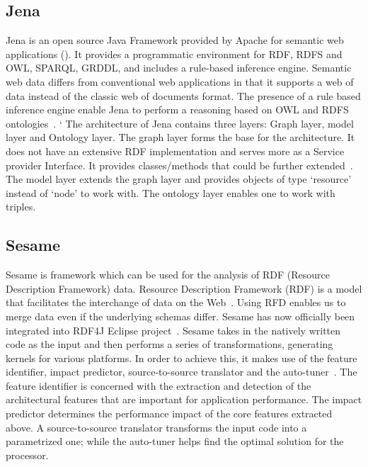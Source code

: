      \pv

\subsection{Jena }

Jena is an open source Java Framework provided by Apache for semantic
web applications (\cite{www-w3-jena}). It provides a programmatic
environment for RDF, RDFS and OWL, SPARQL, GRDDL, and includes a
rule-based inference engine. Semantic web data differs from
conventional web applications in that it supports a web of data
instead of the classic web of documents format. The presence of a rule
based inference engine enable Jena to perform a reasoning based on OWL
and RDFS ontologies~\cite{www-trimc-nlp-blogspot}. ` The architecture
of Jena contains three layers: Graph layer, model layer and Ontology
layer. The graph layer forms the base for the architecture. It does
not have an extensive RDF implementation and serves more as a Service
provider Interface. It provides classes/methods that could be further
extended~\cite{www-trimc-nlp-blogspot}.  The model layer extends the
graph layer and provides objects of type ‘resource’ instead of ‘node’
to work with.  The ontology layer enables one to work with triples.

     \pv

\subsection{Sesame}

Sesame is framework which can be used for the analysis of RDF
(Resource Description Framework) data.  Resource Description Framework
(RDF) is a model that facilitates the interchange of data on the
Web~\cite{www-RDF}.  Using RFD enables us to merge data even if the
underlying schemas differ.  Sesame has now officially been integrated
into RDF4J Eclipse project~\cite{www-sesame}.  Sesame takes in the
natively written code as the input and then performs a series of
transformations, generating kernels for various platforms.  In order
to achieve this, it makes use of the feature identifier, impact
predictor, source-to-source translator and the
auto-tuner~\cite{sesame-paper-2013}.  The feature identifier is
concerned with the extraction and detection of the architectural
features that are important for application performance.  The impact
predictor determines the performance impact of the core features
extracted above.  A source-to-source translator transforms the input
code into a parametrized one; while the auto-tuner helps find the
optimal solution for the processor.


